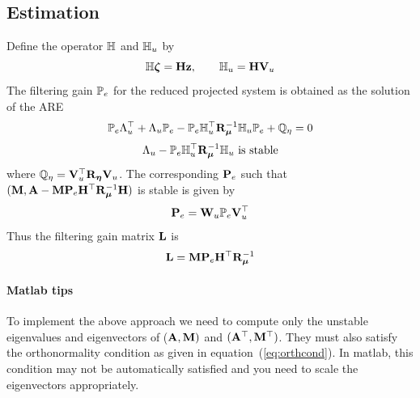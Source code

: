 \documentclass[12pt]{article}
\begin{document}
\subsection{Estimation}
Define the operator $\mathbb{H}$ and $\mathbb{H}_u$ by
\[
 \mathbb{H} \boldsymbol{\zeta} = {\mathbf H} {\mathbf z}, \qquad \mathbb{H}_u = {\mathbf H} {\mathbf V}_u
\]
The filtering gain $\mathbb{P}_e$ for the reduced projected system is obtained as the solution of the ARE
\[
 \mathbb{P}_e \Lambda_u^\top + \Lambda_u \mathbb{P}_e - \mathbb{P}_e \mathbb{H}_u^\top {\mathbf R}_{\boldsymbol\mu}^{-1} \mathbb{H}_u \mathbb{P}_e + \mathbb{Q}_\eta = 0
\]
\[
 \Lambda_u - \mathbb{P}_e \mathbb{H}_u^\top {\mathbf R}_{\boldsymbol\mu}^{-1} \mathbb{H}_u \text{ is stable} 
\]
where $\mathbb{Q}_\eta = {\mathbf V}_u^\top {\mathbf R}_{\boldsymbol\eta} {\mathbf V}_u$. The corresponding ${\mathbf P}_e$ such that $({\mathbf M},{\mathbf A} - {\mathbf M} {\mathbf P}_e {\mathbf H}^\top {\mathbf R}_{\boldsymbol\mu}^{-1} {\mathbf H})$ is stable is given by
\[
 {\mathbf P}_e = {\mathbf W}_u \mathbb{P}_e {\mathbf V}_u^\top
\]
Thus the filtering gain matrix ${\mathbf L}$ is
\[
 {\mathbf L} = {\mathbf M} {\mathbf P}_e {\mathbf H}^\top {\mathbf R}_{\boldsymbol\mu}^{-1}
\]
\paragraph{Matlab tips}
To implement the above approach we need to compute only the unstable eigenvalues and eigenvectors of (${\mathbf A},{\mathbf M})$ and $({\mathbf A}^\top,{\mathbf M}^\top)$. They must also satisfy the orthonormality condition as given in equation~(\ref{eq:orthcond}). In matlab, this condition may not be automatically satisfied and you need to scale the eigenvectors appropriately.
\end{document}
